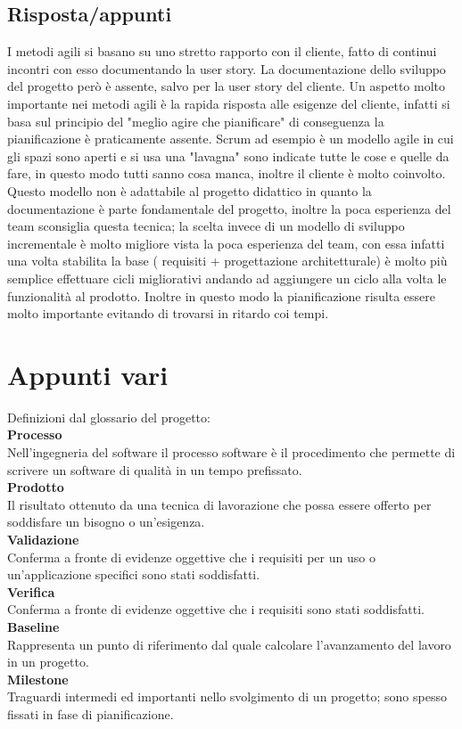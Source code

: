 \subsection*{Risposta/appunti}
I metodi agili si basano su uno stretto rapporto con il cliente, fatto di continui incontri con esso documentando la user
story. La documentazione dello sviluppo del progetto però è assente, salvo per la user story del cliente.
Un aspetto molto importante nei metodi agili è la rapida risposta alle esigenze del cliente, infatti si basa sul principio del
"meglio agire che pianificare" di conseguenza la pianificazione è praticamente assente. Scrum ad esempio è un modello
agile in cui gli spazi sono aperti e si usa una "lavagna" sono indicate tutte le cose e quelle da fare, in questo modo tutti
sanno cosa manca, inoltre il cliente è molto coinvolto.
Questo modello non è adattabile al progetto didattico in quanto la documentazione è parte fondamentale del progetto,
inoltre la poca esperienza del team sconsiglia questa tecnica; la scelta invece di un modello di sviluppo incrementale è
molto migliore vista la poca esperienza del team, con essa infatti una volta stabilita la base ( requisiti + progettazione
architetturale) è molto più semplice effettuare cicli migliorativi andando ad aggiungere un ciclo alla volta le funzionalità
al prodotto. Inoltre in questo modo la pianificazione risulta essere molto importante evitando di trovarsi in ritardo coi
tempi.

\section{Appunti vari}

Definizioni dal glossario del progetto:\\
\textbf{Processo}\\
Nell'ingegneria del software il processo software è il procedimento che permette di
scrivere un software di qualità in un tempo prefissato.\\
\textbf{Prodotto}\\
Il risultato ottenuto da una tecnica di lavorazione che possa essere offerto per
soddisfare un bisogno o un'esigenza.\\
\textbf{Validazione}\\
Conferma a fronte di evidenze oggettive che i requisiti per un uso o un'applicazione
specifici sono stati soddisfatti.\\
\textbf{Verifica}\\
Conferma a fronte di evidenze oggettive che i requisiti sono stati soddisfatti.\\
\textbf{Baseline}\\
Rappresenta un punto di riferimento dal quale calcolare l’avanzamento del lavoro
in un progetto.\\
\textbf{Milestone}\\
Traguardi intermedi ed importanti nello svolgimento di un progetto; sono spesso
fissati in fase di pianificazione.\\


